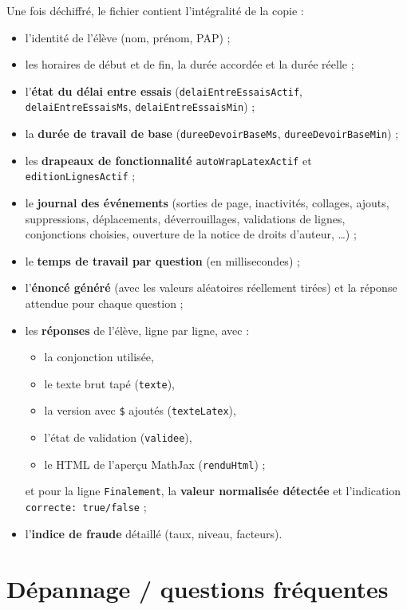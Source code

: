 \documentclass[11pt,a4paper]{article}
\begin{document}
Une fois déchiffré, le fichier contient l'intégralité de la copie :
\begin{itemize}
  \item l'identité de l'élève (nom, prénom, PAP) ;
  \item les horaires de début et de fin, la durée accordée et la durée
        réelle ;
  \item l'\textbf{état du délai entre essais} (\texttt{delaiEntreEssaisActif},
        \texttt{delaiEntreEssaisMs}, \texttt{delaiEntreEssaisMin}) ;
  \item la \textbf{durée de travail de base}
        (\texttt{dureeDevoirBaseMs}, \texttt{dureeDevoirBaseMin}) ;
  \item les \textbf{drapeaux de fonctionnalité} \texttt{autoWrapLatexActif}
        et \texttt{editionLignesActif} ;
  \item le \textbf{journal des événements} (sorties de page, inactivités,
        collages, ajouts, suppressions, déplacements, déverrouillages,
        validations de lignes, conjonctions choisies, ouverture de la notice
        de droits d'auteur, \dots) ;
  \item le \textbf{temps de travail par question} (en millisecondes) ;
  \item l'\textbf{énoncé généré} (avec les valeurs aléatoires réellement
        tirées) et la réponse attendue pour chaque question ;
  \item les \textbf{réponses} de l'élève, ligne par ligne, avec :
        \begin{itemize}
          \item la conjonction utilisée,
          \item le texte brut tapé (\texttt{texte}),
          \item la version avec \texttt{\$} ajoutés (\texttt{texteLatex}),
          \item l'état de validation (\texttt{validee}),
          \item le HTML de l'aperçu MathJax (\texttt{renduHtml}) ;
        \end{itemize}
        et pour la ligne \texttt{Finalement}, la \textbf{valeur normalisée
        détectée} et l'indication \texttt{correcte: true/false} ;
  \item l'\textbf{indice de fraude} détaillé (taux, niveau, facteurs).
\end{itemize}

\section{Dépannage / questions fréquentes}
\end{document}
